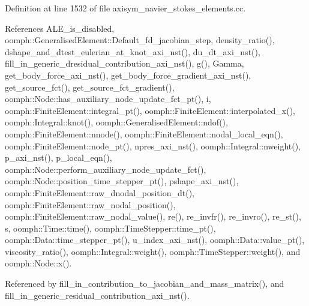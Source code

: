 Definition at line 1532 of file axisym\+\_\+navier\+\_\+stokes\+\_\+elements.\+cc.



References A\+L\+E\+\_\+is\+\_\+disabled, oomph\+::\+Generalised\+Element\+::\+Default\+\_\+fd\+\_\+jacobian\+\_\+step, density\+\_\+ratio(), dshape\+\_\+and\+\_\+dtest\+\_\+eulerian\+\_\+at\+\_\+knot\+\_\+axi\+\_\+nst(), du\+\_\+dt\+\_\+axi\+\_\+nst(), fill\+\_\+in\+\_\+generic\+\_\+dresidual\+\_\+contribution\+\_\+axi\+\_\+nst(), g(), Gamma, get\+\_\+body\+\_\+force\+\_\+axi\+\_\+nst(), get\+\_\+body\+\_\+force\+\_\+gradient\+\_\+axi\+\_\+nst(), get\+\_\+source\+\_\+fct(), get\+\_\+source\+\_\+fct\+\_\+gradient(), oomph\+::\+Node\+::has\+\_\+auxiliary\+\_\+node\+\_\+update\+\_\+fct\+\_\+pt(), i, oomph\+::\+Finite\+Element\+::integral\+\_\+pt(), oomph\+::\+Finite\+Element\+::interpolated\+\_\+x(), oomph\+::\+Integral\+::knot(), oomph\+::\+Generalised\+Element\+::ndof(), oomph\+::\+Finite\+Element\+::nnode(), oomph\+::\+Finite\+Element\+::nodal\+\_\+local\+\_\+eqn(), oomph\+::\+Finite\+Element\+::node\+\_\+pt(), npres\+\_\+axi\+\_\+nst(), oomph\+::\+Integral\+::nweight(), p\+\_\+axi\+\_\+nst(), p\+\_\+local\+\_\+eqn(), oomph\+::\+Node\+::perform\+\_\+auxiliary\+\_\+node\+\_\+update\+\_\+fct(), oomph\+::\+Node\+::position\+\_\+time\+\_\+stepper\+\_\+pt(), pshape\+\_\+axi\+\_\+nst(), oomph\+::\+Finite\+Element\+::raw\+\_\+dnodal\+\_\+position\+\_\+dt(), oomph\+::\+Finite\+Element\+::raw\+\_\+nodal\+\_\+position(), oomph\+::\+Finite\+Element\+::raw\+\_\+nodal\+\_\+value(), re(), re\+\_\+invfr(), re\+\_\+invro(), re\+\_\+st(), s, oomph\+::\+Time\+::time(), oomph\+::\+Time\+Stepper\+::time\+\_\+pt(), oomph\+::\+Data\+::time\+\_\+stepper\+\_\+pt(), u\+\_\+index\+\_\+axi\+\_\+nst(), oomph\+::\+Data\+::value\+\_\+pt(), viscosity\+\_\+ratio(), oomph\+::\+Integral\+::weight(), oomph\+::\+Time\+Stepper\+::weight(), and oomph\+::\+Node\+::x().



Referenced by fill\+\_\+in\+\_\+contribution\+\_\+to\+\_\+jacobian\+\_\+and\+\_\+mass\+\_\+matrix(), and fill\+\_\+in\+\_\+generic\+\_\+residual\+\_\+contribution\+\_\+axi\+\_\+nst().

\mbox{\label{classoomph_1_1AxisymmetricNavierStokesEquations_ac0c850c7a41b408784f3a103f9aba982}} 
